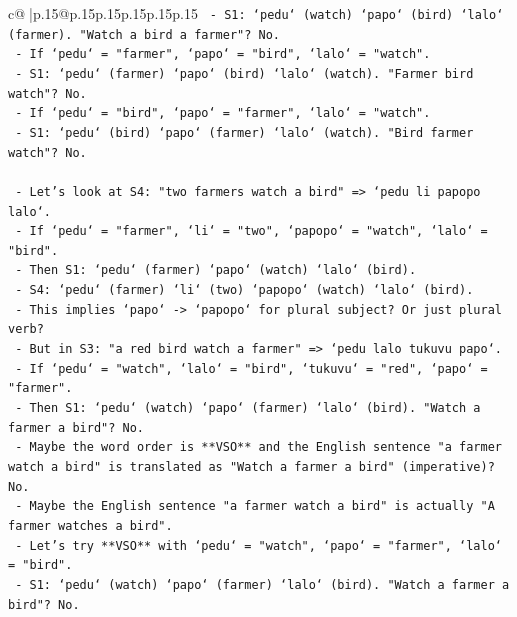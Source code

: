 \documentclass{article}
\begin{document}
{\begin{supertabular}{c@{$\;$}|p{.15\linewidth}@{}p{.15\linewidth}p{.15\linewidth}p{.15\linewidth}p{.15\linewidth}p{.15\linewidth}}
{{{\texttt{                     {-} S1: `pedu` (watch) `papo` (bird) `lalo` (farmer). "Watch a bird a farmer"? No.} \\
\texttt{                   {-} If `pedu` = "farmer", `papo` = "bird", `lalo` = "watch".} \\
\texttt{                     {-} S1: `pedu` (farmer) `papo` (bird) `lalo` (watch). "Farmer bird watch"? No.} \\
\texttt{                   {-} If `pedu` = "bird", `papo` = "farmer", `lalo` = "watch".} \\
\texttt{                     {-} S1: `pedu` (bird) `papo` (farmer) `lalo` (watch). "Bird farmer watch"? No.} \\
\\ 
\texttt{                 {-} Let's look at S4: "two farmers watch a bird" => `pedu li papopo lalo`.} \\
\texttt{                   {-} If `pedu` = "farmer", `li` = "two", `papopo` = "watch", `lalo` = "bird".} \\
\texttt{                   {-} Then S1: `pedu` (farmer) `papo` (watch) `lalo` (bird).} \\
\texttt{                   {-} S4: `pedu` (farmer) `li` (two) `papopo` (watch) `lalo` (bird).} \\
\texttt{                   {-} This implies `papo` {-}> `papopo` for plural subject? Or just plural verb?} \\
\texttt{                   {-} But in S3: "a red bird watch a farmer" => `pedu lalo tukuvu papo`.} \\
\texttt{                   {-} If `pedu` = "watch", `lalo` = "bird", `tukuvu` = "red", `papo` = "farmer".} \\
\texttt{                   {-} Then S1: `pedu` (watch) `papo` (farmer) `lalo` (bird). "Watch a farmer a bird"? No.} \\
\texttt{                   {-} Maybe the word order is **VSO** and the English sentence "a farmer watch a bird" is translated as "Watch a farmer a bird" (imperative)? No.} \\
\texttt{                   {-} Maybe the English sentence "a farmer watch a bird" is actually "A farmer watches a bird".} \\
\texttt{                   {-} Let's try **VSO** with `pedu` = "watch", `papo` = "farmer", `lalo` = "bird".} \\
\texttt{                     {-} S1: `pedu` (watch) `papo` (farmer) `lalo` (bird). "Watch a farmer a bird"? No.} \\
}}}
\end{supertabular}}
\end{document}
